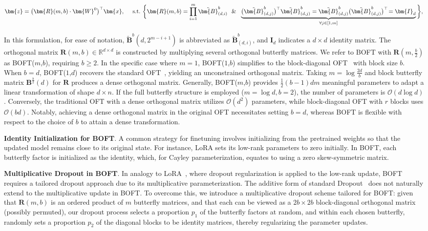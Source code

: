 \begin{equation}
    \begin{aligned}\nonumber
    \bm{z}=\big(\bm{R}(m,b)\cdot\bm{W}^0\big)^\top\bm{x},~~~~\text{s.t.}~\bigg{\{}\bm{R}(m,b)=\prod_{i=1}^m \tilde{\bm{B}}^b_{(d,i)}~~\&~~\underbrace{\big(\tilde{\bm{B}}^b_{(d,j)}\big)^\top\tilde{\bm{B}}^b_{(d,j)}=\tilde{\bm{B}}^b_{(d,j)}\big(\tilde{\bm{B}}^b_{(d,j)}\big)^\top\!=\bm{I}_d}_{\forall j\in [1, m]}\bigg{\}},
    \end{aligned}
\end{equation}

In this formulation, for ease of notation, $\tilde{\bm{B}}^b(d,2^{m - i+1})$ is abbreviated as $\tilde{\bm{B}}^b_{(d,i)}$, and $\bm{I}_d$ indicates a $d \times d$ identity matrix. The orthogonal matrix $\bm{R}(m,b)\in\mathbb{R}^{d\times d}$ is constructed by multiplying several orthogonal butterfly matrices. We refer to BOFT with $\bm{R}(m,\frac{b}{2})$ as BOFT($m$,$b$), requiring $b\geq 2$. In the specific case where $m=1$, BOFT($1$,$b$) simplifies to the block-diagonal OFT~\cite{qiu2023controlling} with block size $b$. When $b=d$, BOFT($1$,$d$) recovers the standard OFT~\cite{qiu2023controlling}, yielding an unconstrained orthogonal matrix. Taking $m=\log \frac{2d}{b}$ and block butterfly matrix $\bm{B}^{\frac{b}{2}}(d)$ for $\bm{R}$ produces a dense orthogonal matrix. Generally, BOFT($m$,$b$) provides $\frac{1}{2}(b-1)dm$ meaningful parameters to adapt a linear transformation of shape $d\times n$. If the full butterfly structure is employed ($m=\log d,b=2$), the number of parameters is $\mathcal{O}(d\log d)$. Conversely, the traditional OFT with a dense orthogonal matrix utilizes $\mathcal{O}(d^2)$ parameters, while block-diagonal OFT with $r$ blocks uses $\mathcal{O}(bd)$. Notably, achieving a dense orthogonal matrix in the original OFT necessitates setting $b=d$, whereas BOFT is flexible with respect to the choice of $b$ to attain a dense transformation.

\textbf{Identity Initialization for BOFT}. A common strategy for finetuning involves initializing from the pretrained weights so that the updated model remains close to its original state. For instance, LoRA sets its low-rank parameters to zero initially. In BOFT, each butterfly factor is initialized as the identity, which, for Cayley parameterization, equates to using a zero skew-symmetric matrix.

\textbf{Multiplicative Dropout in BOFT}. In analogy to LoRA~\cite{hulora2022}, where dropout regularization is applied to the low-rank update, BOFT requires a tailored dropout approach due to its multiplicative parameterization. The additive form of standard Dropout~\cite{srivastava2014dropout} does not naturally extend to the multiplicative update in BOFT. To overcome this, we introduce a multiplicative dropout scheme tailored for BOFT: given that $\bm{R}(m,b)$ is an ordered product of $m$ butterfly matrices, and that each can be viewed as a $2b\times 2b$ block-diagonal orthogonal matrix (possibly permuted), our dropout process selects a proportion $p_1$ of the butterfly factors at random, and within each chosen butterfly, randomly sets a proportion $p_2$ of the diagonal blocks to be identity matrices, thereby regularizing the parameter updates.


